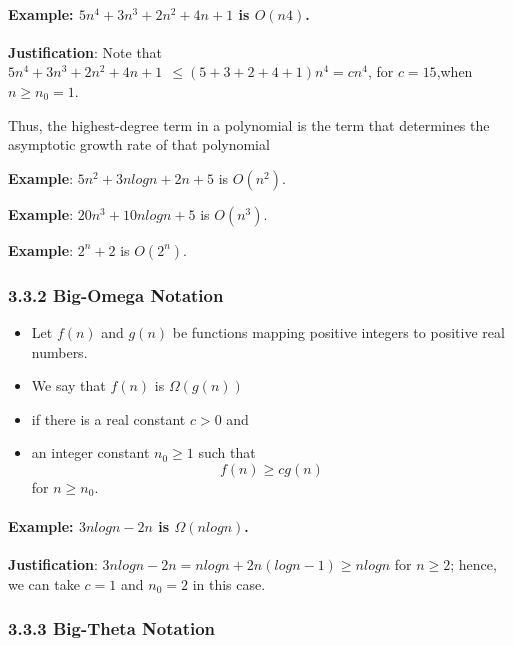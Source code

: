 \documentclass[11pt]{article}
\providecommand{\tightlist}{%
      \setlength{\itemsep}{0pt}\setlength{\parskip}{0pt}}
\begin{document}
    \hypertarget{example-5n4-3n3-2n2-4n1-is-on4.}{%
\paragraph{\texorpdfstring{Example: \(5n^4 +3n^3 +2n^2 +4n+1\) is
\(O(n4)\).}{Example: 5n\^{}4 +3n\^{}3 +2n\^{}2 +4n+1 is O(n4).}}\label{example-5n4-3n3-2n2-4n1-is-on4.}}

\textbf{Justification}: Note that
\(5n^4+3n^3+2n^2+4n+1~~\le(5+3+2+4+1)n^4 =cn^4\), for \(c=15\),when
\(n\ge n_0 =1\).

Thus, the highest-degree term in a polynomial is the term that
determines the asymptotic growth rate of that polynomial

    \textbf{Example}: \(5n^2 +3n log n+2n+5\) is \(O(n^2)\).

\textbf{Example}: \(20n^3 +10nlogn+5\) is \(O(n^3)\).

\textbf{Example}: \(2^n+2\) is \(O(2^n)\).

    \hypertarget{big-omega-notation}{%
\subsubsection{3.3.2 Big-Omega Notation}\label{big-omega-notation}}

\begin{itemize}
\tightlist
\item
  Let \(f(n)\) and \(g(n)\) be functions mapping positive integers to
  positive real numbers.
\item
  We say that \(f(n)\) is \(\Omega(g(n))\)
\item
  if there is a real constant \(c > 0\) and
\item
  an integer constant \(n_0 \ge 1\) such that \[
  f(n)\ge cg(n) 
  \] for \(n\ge n_0\).
\end{itemize}

    \hypertarget{example-3n-log-n-2n-is-omegan-log-n.}{%
\paragraph{\texorpdfstring{Example: \(3n log n − 2n\) is
\(\Omega(n log n)\).}{Example: 3n log n − 2n is \textbackslash Omega(n log n).}}\label{example-3n-log-n-2n-is-omegan-log-n.}}

\textbf{Justification}: \(3nlogn−2n = nlogn+2n(logn−1) \ge n log n\) for
\(n \ge 2\); hence, we can take \(c=1\) and \(n_0 =2\) in this case.

    \hypertarget{big-theta-notation}{%
\subsubsection{3.3.3 Big-Theta Notation}\label{big-theta-notation}}
\end{document}
